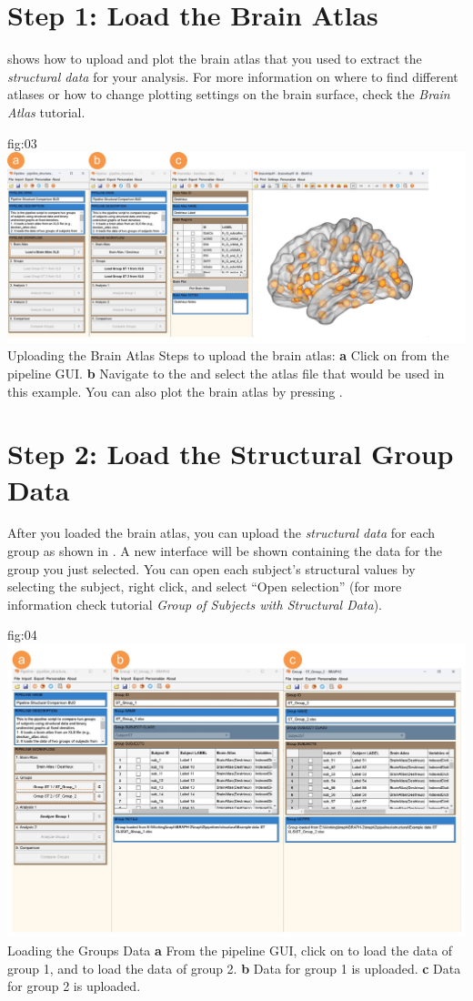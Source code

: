 \documentclass[justified]{tufte-handout}
\begin{document}
\section{Step 1: Load the Brain Atlas}
 shows how to upload and plot the brain atlas that you used to extract the \emph{structural data} for your analysis. For more information on where to find different atlases or how to change plotting settings on the brain surface, check the \emph{Brain Atlas} tutorial.

	{fig:03}
	{
	\includegraphics{fig03.jpg}
	}
	{Uploading the Brain Atlas}
	{
	Steps to upload the brain atlas:
	{\bf a} Click on  from the pipeline GUI.
	{\bf b} Navigate to the  and select the atlas file  that would be used in this example. You can also plot the brain atlas by pressing . 
	}
 
\section{Step 2: Load the Structural Group Data}

After you loaded the brain atlas, you can upload the \emph{structural data} for each group as shown in . A new interface will be shown containing the data for the group you just selected. You can open each subject’s structural values by selecting
the subject, right click, and select “Open selection” (for more information check tutorial \emph{Group of Subjects with Structural Data}).
	
	{fig:04}
	{
	\includegraphics{fig04.jpg}
	}
	{Loading the Groups Data}
	{
	{\bf a} From the pipeline GUI, click on  to load the data of group 1, and  to load the data of group 2.
	{\bf b} Data for group 1 is uploaded. {\bf c} Data for group 2 is uploaded.
	}
\end{document}
